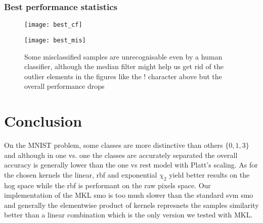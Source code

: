 \documentclass{acmsiggraph}
\newcommand{\1}{\mathbf{1}}
\newcommand{\0}{\mathbf{0}}
\begin{document}
\subsubsection{Best performance statistics}
\begin{figure}[H]
\centering
\texttt{[image: best\_cf]}
\end{figure}
\begin{figure}[H]
\centering
\texttt{[image: best\_mis]}
\caption{Some misclassified samples are unrecognisable even by a human classifier, although the median filter might help us get rid of the outlier elements in the figures like the ! character above but the overall performance drops}
\end{figure}
\section{Conclusion}
On the MNIST problem, some classes are more distinctive than others $\{0,1,3\}$ and although in one vs. one the classes are accurately separated the overall accuracy is generally lower than the one vs rest model with Platt's scaling. As for the chosen kernels the linear, rbf and exponential $\chi_2$ yield better results on the hog space while the rbf is performant on the raw pixels space. Our implementation of the MKL smo is too mush slower than the standard svm smo and generally the elementwise product of kernels represnets the samples similarity better than a linear combination which is the only version we tested with MKL.

\nocite{*}

\end{document}
